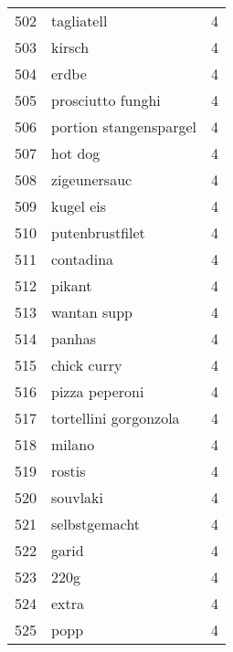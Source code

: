 \begin{tabular}{llr}
502  &                                         tagliatell &      4 \\
503  &                                             kirsch &      4 \\
504  &                                              erdbe &      4 \\
505  &                                  prosciutto funghi &      4 \\
506  &                             portion stangenspargel &      4 \\
507  &                                            hot dog &      4 \\
508  &                                       zigeunersauc &      4 \\
509  &                                          kugel eis &      4 \\
510  &                                    putenbrustfilet &      4 \\
511  &                                          contadina &      4 \\
512  &                                             pikant &      4 \\
513  &                                        wantan supp &      4 \\
514  &                                             panhas &      4 \\
515  &                                        chick curry &      4 \\
516  &                                     pizza peperoni &      4 \\
517  &                              tortellini gorgonzola &      4 \\
518  &                                             milano &      4 \\
519  &                                             rostis &      4 \\
520  &                                           souvlaki &      4 \\
521  &                                      selbstgemacht &      4 \\
522  &                                              garid &      4 \\
523  &                                               220g &      4 \\
524  &                                              extra &      4 \\
525  &                                               popp &      4 \\

\end{tabular}
